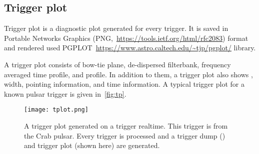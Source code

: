 \subsection {Trigger plot}
\label{ssub:tp}
\par Trigger plot is a diagnostic plot generated for every trigger. 
It is saved in Portable Networks Graphics (PNG,~\url{https://tools.ietf.org/html/rfc2083}) format and rendered used PGPLOT~\url{https://www.astro.caltech.edu/~tjp/pgplot/} library.

\par A trigger plot consists of bow-tie plane, de-dispersed filterbank, frequency averaged time profile, and \dm profile. 
In addition to them, a trigger plot also shows \sn, width, pointing information, and time information.
A typical trigger plot for a known pulsar trigger is given in~\autoref{fig:tp}.

\begin{figure}
	\centering
	\label{fig:tp}
	\texttt{[image: tplot.png]}
	\caption{A trigger plot generated on a trigger realtime. This trigger is from the Crab pulsar. Every trigger is processed and a trigger dump (\dbson) and trigger plot (shown here) are generated.}
\end{figure}

